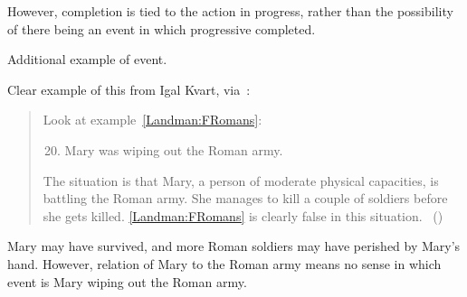 \begin{note}
  However, completion is tied to the action in progress, rather than the possibility of there being an event in which progressive completed.

  Additional example of event.

  Clear example of this from Igal Kvart, via~\textcite{Landman:1992wh}:

  \begin{quote}
    Look at example~\ref{Landman:FRomans}:
    \begin{enumerate}[label=(\arabic*), ref=(\arabic*)]
      \setcounter{enumi}{19}
    \item
      \label{Landman:FRomans}
      Mary was wiping out the Roman army.
    \end{enumerate}

    The situation is that Mary, a person of moderate physical capacities, is battling the Roman army.
    She manages to kill a couple of soldiers before she gets killed.
    \ref{Landman:FRomans} is clearly false in this situation.\newline
    \mbox{ }\hfill\mbox{(\citeyear[18]{Landman:1992wh})}
  \end{quote}

  Mary may have survived, and more Roman soldiers may have perished by Mary's hand.
  However, relation of Mary to the Roman army means no sense in which event is Mary wiping out the Roman army.
\end{note}

